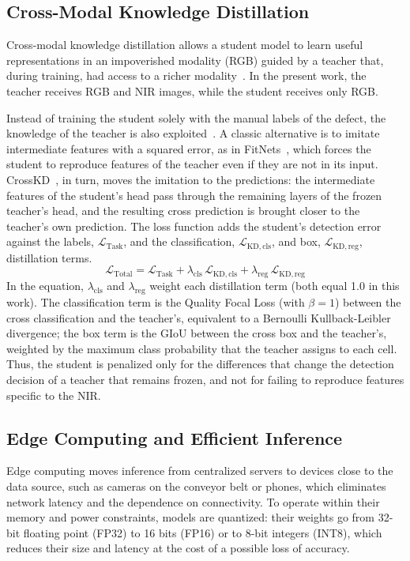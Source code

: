 \documentclass[journal]{IEEEtran}
\begin{document}
\subsection{Cross-Modal Knowledge Distillation}\label{sec:crossmodal}
Cross-modal knowledge distillation allows a student model to learn useful representations in an impoverished modality (RGB) guided by a teacher that, during training, had access to a richer modality~\cite{gupta2016}. In the present work, the teacher receives RGB and NIR images, while the student receives only RGB.

Instead of training the student solely with the manual labels of the defect, the knowledge of the teacher is also exploited~\cite{gou2021}. A classic alternative is to imitate intermediate features with a squared error, as in FitNets~\cite{romero2015}, which forces the student to reproduce features of the teacher even if they are not in its input. CrossKD~\cite{wang2024}, in turn, moves the imitation to the predictions: the intermediate features of the student's head pass through the remaining layers of the frozen teacher's head, and the resulting cross prediction is brought closer to the teacher's own prediction. The loss function adds the student's detection error against the labels, $\mathcal{L}_{\mathrm{Task}}$, and the classification, $\mathcal{L}_{\mathrm{KD,cls}}$, and box, $\mathcal{L}_{\mathrm{KD,reg}}$, distillation terms.
\begin{equation}\label{eq:loss}
\mathcal{L}_{\mathrm{Total}} = \mathcal{L}_{\mathrm{Task}} + \lambda_{\mathrm{cls}}\,\mathcal{L}_{\mathrm{KD,cls}} + \lambda_{\mathrm{reg}}\,\mathcal{L}_{\mathrm{KD,reg}}
\end{equation}
In the equation, $\lambda_{\mathrm{cls}}$ and $\lambda_{\mathrm{reg}}$ weight each distillation term (both equal 1.0 in this work). The classification term is the Quality Focal Loss (with $\beta = 1$) between the cross classification and the teacher's, equivalent to a Bernoulli Kullback-Leibler divergence; the box term is the GIoU between the cross box and the teacher's, weighted by the maximum class probability that the teacher assigns to each cell. Thus, the student is penalized only for the differences that change the detection decision of a teacher that remains frozen, and not for failing to reproduce features specific to the NIR.

\subsection{Edge Computing and Efficient Inference}\label{sec:edge}
Edge computing moves inference from centralized servers to devices close to the data source, such as cameras on the conveyor belt or phones, which eliminates network latency and the dependence on connectivity. To operate within their memory and power constraints, models are quantized: their weights go from 32-bit floating point (FP32) to 16 bits (FP16) or to 8-bit integers (INT8), which reduces their size and latency at the cost of a possible loss of accuracy.
\end{document}

